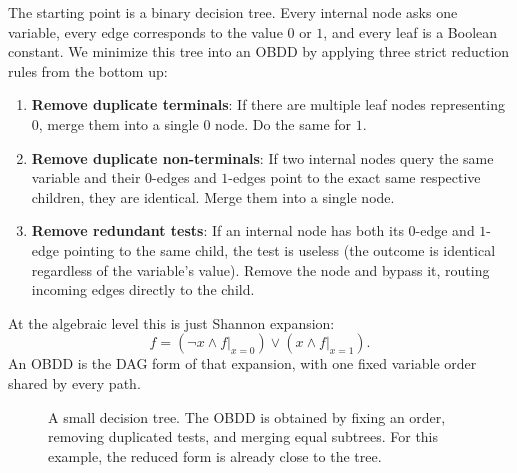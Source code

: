 The starting point is a binary decision tree. Every internal node asks one variable, every edge corresponds to the value $0$ or $1$, and every leaf is a Boolean constant. We minimize this tree into an OBDD by applying three strict reduction rules from the bottom up:
\begin{enumerate}
    \item \textbf{Remove duplicate terminals}: If there are multiple leaf nodes representing $0$, merge them into a single $0$ node. Do the same for $1$.
    \item \textbf{Remove duplicate non-terminals}: If two internal nodes query the same variable and their $0$-edges and $1$-edges point to the exact same respective children, they are identical. Merge them into a single node.
    \item \textbf{Remove redundant tests}: If an internal node has both its $0$-edge and $1$-edge pointing to the same child, the test is useless (the outcome is identical regardless of the variable's value). Remove the node and bypass it, routing incoming edges directly to the child.
\end{enumerate}

At the algebraic level this is just Shannon expansion:
\[
  f = (\neg x \land f|_{x=0}) \lor (x \land f|_{x=1}).
\]
An OBDD is the DAG form of that expansion, with one fixed variable order
shared by every path.

\begin{figure}[ht]
  \centering
  \caption{A small decision tree.  The OBDD is obtained by fixing an order,
           removing duplicated tests, and merging equal subtrees.  For this
           example, the reduced form is already close to the tree.}
  \label{fig:decision-tree-obdd}
\end{figure}

